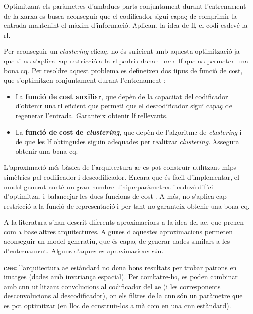 \documentclass[CAT,BIB]{TFUOC}%
\begin{document}
        Optimitzant els paràmetres d'ambdues parts conjuntament durant l'entrenament de la xarxa es busca aconseguir que el codificador sigui capaç de comprimir la entrada mantenint el màxim d'informació. Aplicant la idea de \gls{fl}, el codi esdevé la \gls{rl}.

        Per aconseguir un \textit{clustering} eficaç, no és suficient amb aquesta optimització ja que si no s'aplica cap restricció a la \gls{rl} podria donar lloc a \gls{lf} que no permeten una bona \gls{cq}. Per resoldre aquest problema es defineixen dos tipus de funció de cost, que s'optimitzen conjuntament durant l'entrenament \citep{Min2018}:
        \begin{itemize}
            \item La \textbf{funció de cost auxiliar}, que depèn de la capacitat del codificador d'obtenir una \gls{rl} eficient que permeti que el descodificador sigui capaç de regenerar l'entrada. Garanteix obtenir \gls{lf} rellevants.
            \item La \textbf{funció de cost de \textit{clustering}}, que depèn de l'algoritme de \textit{clustering} i de que les \gls{lf} obtingudes siguin adequades per realitzar \textit{clustering}. Assegura obtenir una bona \gls{cq}.
        \end{itemize}

        L'aproximació més bàsica de l'arquitectura \gls{ae} es pot construir utilitzant \glspl{mlp} simètrics pel codificador i descodificador. Encara que és fàcil d'implementar, el model generat conté un gran nombre d'hiperparàmetres i esdevé difícil d'optimitzar i balancejar les dues funcions de cost \citep{Karim2021}. A més, no s'aplica cap restricció a la funció de representació i per tant no garanteix obtenir una bona \gls{cq}.

        A la literatura s'han descrit diferents aproximacions a la idea del \gls{ae}, que prenen com a base altres arquitectures. Algunes d'aquestes aproximacions permeten aconseguir un model generatiu, que és capaç de generar dades similars a les d'entrenament. Alguns d'aquestes aproximacions són:

        \textbf{\Gls{cae}:} l'arquitectura \gls{ae} estàndard no dona bons resultats per trobar patrons en imatges (dades amb invariança espacial). Per combatre-ho, es poden combinar amb \gls{cnn} utilitzant convolucions al codificador del \gls{ae} (i les corresponents desconvolucions al descodificador), on els filtres de la \gls{cnn} són un paràmetre que es pot optimitzar (en lloc de construir-los a mà com en una \gls{cnn} estàndard).
\end{document}

